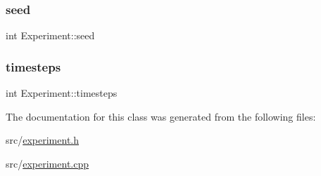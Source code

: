 \subsubsection{\texorpdfstring{seed}{seed}}
{\footnotesize\ttfamily int Experiment\+::seed}

\mbox{\label{class_experiment_a380452065b55d8e50a95b4f3608a80ca}} 
\subsubsection{\texorpdfstring{timesteps}{timesteps}}
{\footnotesize\ttfamily int Experiment\+::timesteps}



The documentation for this class was generated from the following files\+:\begin{DoxyCompactItemize}
\item 
src/\mbox{\hyperlink{experiment_8h}{experiment.\+h}}\item 
src/\mbox{\hyperlink{experiment_8cpp}{experiment.\+cpp}}\end{DoxyCompactItemize}
